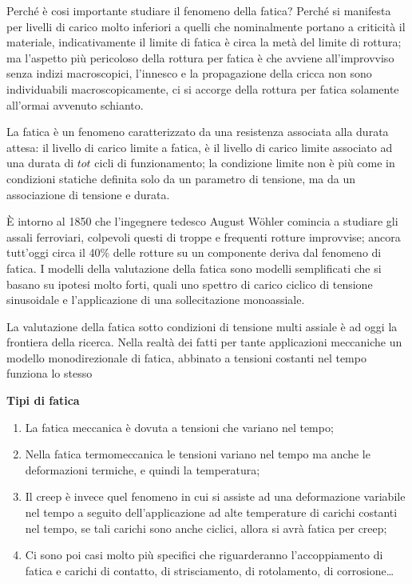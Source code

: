 \documentclass{article}
\begin{document}
\begin{adjustwidth}{2in}{}
		Perché è cosi importante studiare il fenomeno della fatica? Perché si manifesta per livelli di carico molto inferiori a quelli che nominalmente portano a criticità il materiale, indicativamente il limite di fatica è circa la metà del limite di rottura; ma l'aspetto più pericoloso della rottura per fatica è che avviene all'improvviso senza indizi macroscopici, l'innesco e la propagazione della cricca non sono individuabili macroscopicamente, ci si accorge della rottura per fatica solamente all'ormai avvenuto schianto. \newline
		
		La fatica è un fenomeno caratterizzato da una resistenza associata alla durata attesa: il livello di carico limite a fatica, è il livello di carico limite associato ad una durata di $ tot $ cicli di funzionamento; la condizione limite non è più come in condizioni statiche definita solo da un parametro di tensione, ma da un associazione di tensione e durata. \newline
		
		È intorno al 1850 che l'ingegnere tedesco August Wöhler comincia a studiare gli assali ferroviari, colpevoli questi di troppe e frequenti rotture improvvise; ancora tutt'oggi circa il 40\% delle rotture su un componente deriva dal fenomeno di fatica. I modelli della valutazione della fatica sono modelli semplificati che si basano su ipotesi molto forti, quali uno spettro di carico ciclico di tensione sinusoidale e l'applicazione di una sollecitazione monoassiale. 
		
		La valutazione della fatica sotto condizioni di tensione multi assiale è ad oggi la frontiera della ricerca. Nella realtà dei fatti per tante applicazioni meccaniche un modello monodirezionale di fatica, abbinato a tensioni costanti nel tempo funziona lo stesso \newline
		
		\textbf{\Large Tipi di fatica}\newline		
		\begin{enumerate}
			\item La fatica meccanica è dovuta a tensioni  che variano nel tempo;
			\item 	Nella fatica termomeccanica le tensioni variano nel tempo ma anche le deformazioni termiche, e quindi la temperatura;
			\item Il creep è invece quel fenomeno in cui si assiste ad una deformazione variabile nel tempo a seguito dell'applicazione ad alte temperature di carichi costanti nel tempo, se tali carichi sono anche ciclici, allora si avrà fatica per creep;
			\item 	Ci sono poi casi molto più specifici che riguarderanno l'accoppiamento di fatica e carichi di contatto, di strisciamento, di rotolamento, di corrosione\dots
		\end{enumerate}
		

\end{adjustwidth}
\end{document}
